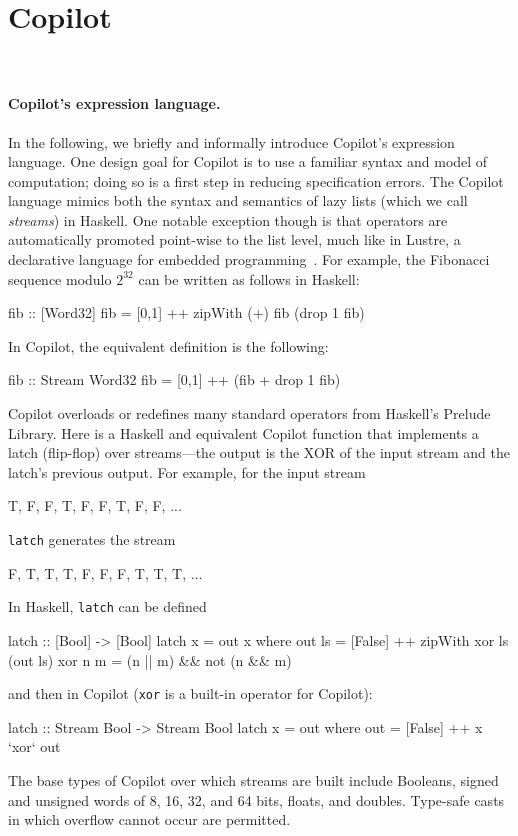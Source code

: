 \section{Copilot}~\label{sec:co-intro} 


\paragraph{Copilot's expression language.}
In the following, we briefly and informally introduce Copilot's expression
language.  One design goal for Copilot is to use a familiar syntax and model of
computation; doing so is a first step in reducing specification errors.  The
Copilot language mimics both the syntax and semantics of lazy lists (which we
call \emph{streams}) in Haskell.  One notable exception though is that
operators are automatically promoted point-wise to the list level, much like in
Lustre, a declarative language for embedded programming~\cite{lustre}.  For
example, the Fibonacci sequence modulo $2^{32}$ can be written as follows in Haskell:
%
\begin{code}
fib :: [Word32]
fib = [0,1] ++ zipWith (+) fib (drop 1 fib)
\end{code}
%
In Copilot, the equivalent definition is the following:
\begin{code}
fib :: Stream Word32
fib = [0,1] ++ (fib + drop 1 fib)
\end{code}
%
Copilot overloads or redefines many standard operators from Haskell's Prelude
Library.  Here is a Haskell and equivalent Copilot function that implements a
latch (flip-flop) over streams---the output is the XOR of the input stream and
the latch's previous output.  For example, for the input stream
%
\begin{code}
T, F, F, T, F, F, T, F, F, ...
\end{code}
%
{\tt latch} generates the stream
\begin{code}
F, T, T, T, F, F, F, T, T, T, ...
\end{code}
%
In Haskell, {\tt latch} can be defined
\begin{code}
latch :: [Bool] -> [Bool]
latch x = out x
  where
  out ls   = [False] ++ zipWith xor ls (out ls)
  xor n m  = (n || m) && not (n && m)
\end{code}
%
and then in Copilot ({\tt xor} is a built-in operator for Copilot):
%
\begin{code}
latch :: Stream Bool -> Stream Bool
latch x = out
  where out = [False] ++ x `xor` out
\end{code}
%
The base types of Copilot over which streams are built include Booleans, signed
and unsigned words of 8, 16, 32, and 64 bits, floats, and doubles. Type-safe
casts in which overflow cannot occur are permitted.

